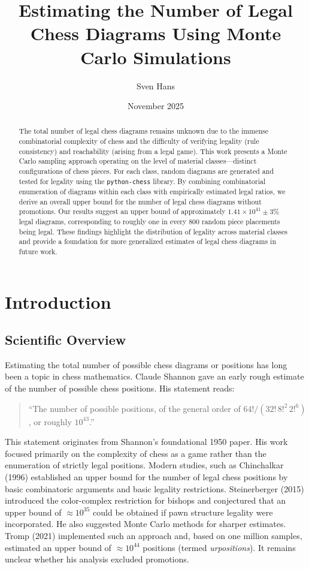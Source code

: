 \documentclass[12pt]{article}
\title{Estimating the Number of Legal Chess Diagrams Using Monte Carlo Simulations}
\author{Sven Hans}
\date{November 2025}
\begin{document}
\maketitle

\begin{abstract}
The total number of legal chess diagrams remains unknown due to the immense
combinatorial complexity of chess and the difficulty of verifying legality (rule consistency) and reachability (arising from a legal game). 
This work presents a Monte Carlo sampling approach operating on the level of 
material classes—distinct configurations of chess pieces. For each class, random 
diagrams are generated and tested for legality using the \texttt{python-chess} library. 
By combining combinatorial enumeration of diagrams within each class with empirically 
estimated legal ratios, we derive an overall upper bound for the number of legal chess diagrams 
without promotions. Our results suggest an upper bound of approximately 
$1.41\times10^{41} \pm 3\%$ legal diagrams, corresponding to roughly one in every 
800 random piece placements being legal. These findings highlight the distribution 
of legality across material classes and provide a foundation for more generalized estimates 
of legal chess diagrams in future work.
\end{abstract}

\section{Introduction}

\subsection{Scientific Overview}

Estimating the total number of possible chess diagrams or positions has long been a topic in chess mathematics. Claude Shannon \cite{shannon1950} gave an early rough estimate of the number of possible chess positions. His statement reads:

\begin{quote}
``The number of possible positions, of the general order of 
$64! / (32! \, 8!^2 \, 2!^6)$, or roughly $10^{43}$.''
\end{quote}

This statement originates from Shannon’s foundational 1950 paper. His work focused primarily on the complexity of chess as a game rather than the enumeration of strictly legal positions. 
Modern studies, such as Chinchalkar (1996) \cite{chinchalkar1996} established an upper bound for the number of legal chess positions by basic combinatoric arguments and basic legality restrictions. Steinerberger (2015) \cite{steinerberger2015} 
introduced the color-complex restriction for bishops and conjectured that an 
upper bound of $\approx 10^{35}$ could be obtained if pawn structure legality were 
incorporated. He also suggested Monte Carlo methods for sharper estimates. 
Tromp (2021) \cite{tromp2021b} implemented such an approach and, based on one 
million samples, estimated an upper bound of $\approx 10^{44}$ positions (termed 
\emph{urpositions}). It remains unclear whether his analysis excluded promotions.
\end{document}
